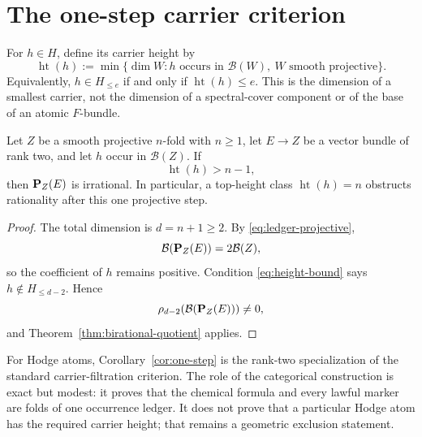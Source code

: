 \section{The one-step carrier criterion}
\label{sec:one-step}

For $h\in H$, define its carrier height by
\[
 \operatorname{ht}(h):=
 \min\{\dim W:h\text{ occurs in }\mathcal B(W),\ W
             \text{ smooth projective}\}.
 \tag{4.1}\label{eq:height}
\]
Equivalently, $h\in H_{\le e}$ if and only if
\(\operatorname{ht}(h)\le e\).  This is the dimension of a smallest carrier,
not the dimension of a spectral-cover component or of the base of an atomic
$F$-bundle.

\begin{corollary}
\label{cor:one-step}
Let $Z$ be a smooth projective $n$-fold with $n\ge1$, let $E\to Z$ be
a vector bundle of rank two, and let $h$ occur in \(\mathcal B(Z)\).  If
\[
 \operatorname{ht}(h)>n-1,
 \tag{4.2}\label{eq:height-bound}
\]
then \(\mathbf P_Z(E)\) is irrational.  In particular, a top-height class
\(\operatorname{ht}(h)=n\) obstructs rationality after this one projective
step.
\end{corollary}

\begin{proof}
The total dimension is $d=n+1\ge2$.  By
\eqref{eq:ledger-projective},
\[
 \mathcal B(\mathbf P_Z(E))=2\mathcal B(Z),
\]
so the coefficient of $h$ remains positive.  Condition
\eqref{eq:height-bound} says $h\notin H_{\le d-2}$.  Hence
\[
 \rho_{d-2}(\mathcal B(\mathbf P_Z(E)))\ne0,
\]
and Theorem~\ref{thm:birational-quotient} applies.
\end{proof}

For Hodge atoms, Corollary~\ref{cor:one-step} is the rank-two specialization
of the standard carrier-filtration criterion.  The role of the categorical
construction is exact but modest: it proves that the chemical formula and
every lawful marker are folds of one occurrence ledger.  It does not prove
that a particular Hodge atom has the required carrier height; that remains a
geometric exclusion statement.

